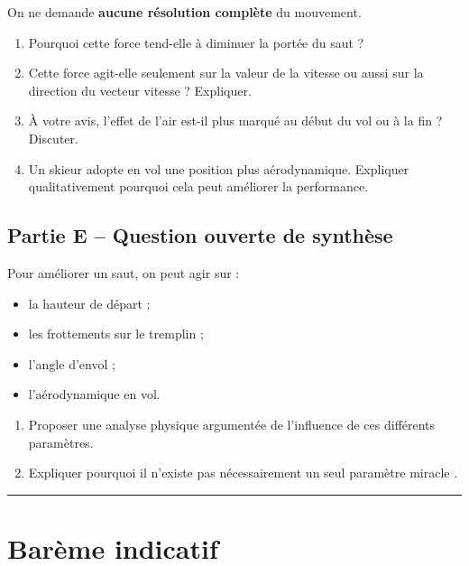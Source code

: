 \documentclass[11pt,a4paper]{article}
\begin{document}
On ne demande \textbf{aucune résolution complète} du mouvement.

\begin{enumerate}[label=\textbf{3.\arabic*}, resume, leftmargin=1.6em]
    \item Pourquoi cette force tend-elle à diminuer la portée du saut ?
    \item Cette force agit-elle seulement sur la valeur de la vitesse ou aussi sur la direction du vecteur vitesse ? Expliquer.
    \item À votre avis, l’effet de l’air est-il plus marqué au début du vol ou à la fin ? Discuter.
    \item Un skieur adopte en vol une position plus aérodynamique. Expliquer qualitativement pourquoi cela peut améliorer la performance.
\end{enumerate}

\subsection*{Partie E -- Question ouverte de synthèse}
Pour améliorer un saut, on peut agir sur :
\begin{itemize}
    \item la hauteur de départ ;
    \item les frottements sur le tremplin ;
    \item l’angle d’envol ;
    \item l’aérodynamique en vol.
\end{itemize}

\begin{enumerate}[label=\textbf{3.\arabic*}, resume, leftmargin=1.6em]
    \item Proposer une analyse physique argumentée de l’influence de ces différents paramètres.
    \item Expliquer pourquoi il n’existe pas nécessairement un \og seul paramètre miracle \fg.
\end{enumerate}

\vspace{0.7em}
\hrule
\vspace{0.5em}

\section*{Barème indicatif}
\end{document}
